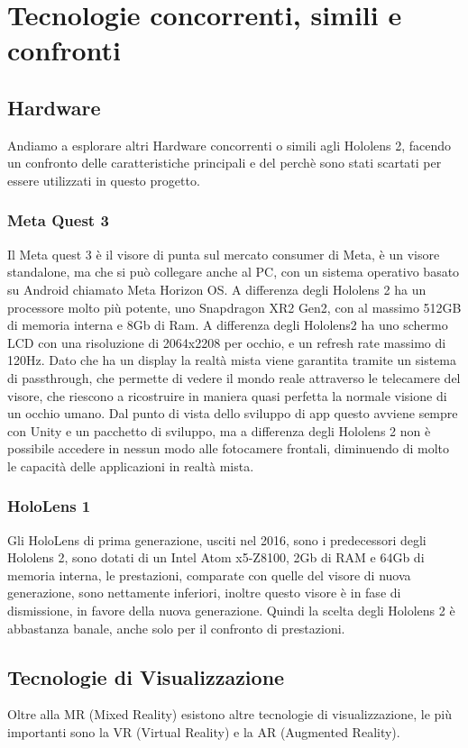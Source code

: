 \chapter{Tecnologie concorrenti, simili e confronti}
\pagestyle{plain}

\section{Hardware}
Andiamo a esplorare altri Hardware concorrenti o simili agli Hololens 2, facendo un confronto delle caratteristiche principali e del perchè sono stati scartati per essere utilizzati in questo progetto.
\subsection{Meta Quest 3}
Il Meta quest 3 è il visore di punta sul mercato consumer di Meta, è un visore standalone, ma che si può collegare anche al PC, con un sistema operativo basato su Android chiamato Meta Horizon OS. A differenza degli Hololens 2 ha un processore molto più potente, uno Snapdragon XR2 Gen2, con al massimo 512GB di memoria interna e 8Gb di Ram. A differenza degli Hololens2 ha uno schermo LCD con una risoluzione di 2064x2208 per occhio, e un refresh rate massimo di 120Hz. Dato che ha un display la realtà mista viene garantita tramite un sistema di passthrough, che permette di vedere il mondo reale attraverso le telecamere del visore, che riescono a ricostruire in maniera quasi perfetta la normale visione di un occhio umano. Dal punto di vista dello sviluppo di app questo avviene sempre con Unity e un pacchetto di sviluppo, ma a differenza degli Hololens 2 non è possibile accedere in nessun modo alle fotocamere frontali, diminuendo di molto le capacità delle applicazioni in realtà mista.
\subsection{HoloLens 1}
Gli HoloLens di prima generazione, usciti nel 2016, sono i predecessori degli Hololens 2, sono dotati di un Intel Atom x5-Z8100, 2Gb di RAM e 64Gb di memoria interna, le prestazioni, comparate con quelle del visore di nuova generazione, sono nettamente inferiori, inoltre questo visore è in fase di dismissione, in favore della nuova generazione. Quindi la scelta degli Hololens 2 è abbastanza banale, anche solo per il confronto di prestazioni.

\section{Tecnologie di Visualizzazione}
Oltre alla MR (Mixed Reality) esistono altre tecnologie di visualizzazione, le più importanti sono la VR (Virtual Reality) e la AR (Augmented Reality).
